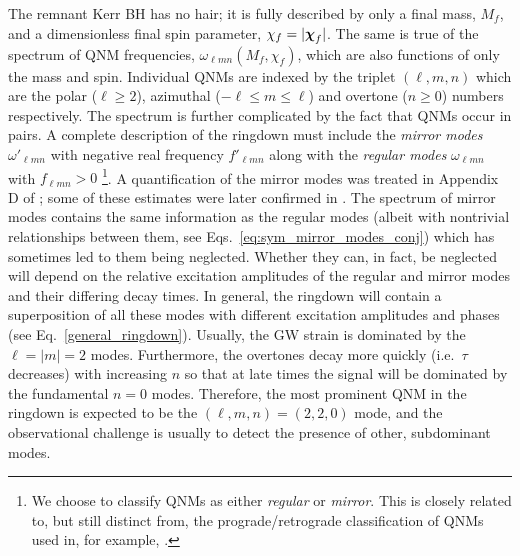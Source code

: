 The remnant Kerr BH has no hair; it is fully described by only a final mass, $M_f$, and a dimensionless final spin parameter, $\chi_f = |\vb*{\chi}_f|$. 
The same is true of the spectrum of QNM frequencies, $\omega_{\ell m n}(M_f, \chi_f)$, which are also functions of only the mass and spin. 
Individual QNMs are indexed by the triplet $(\ell, m, n)$ which are the polar ($\ell\geq2$), azimuthal ($-\ell \leq m \leq \ell$) and overtone ($n \geq 0$) numbers respectively. 
The spectrum is further complicated by the fact that QNMs occur in pairs. 
A complete description of the ringdown must include the \emph{mirror modes} $\omega'_{\ell m n}$ \cite{qnms, bcw, mirror_modes, 2014PhRvD..90l4032L} with negative real frequency $f'_{\ell m n}$ along with the \emph{regular modes} $\omega_{\ell m n}$ with $f_{\ell m n}>0$
\footnote{We choose to classify QNMs as either \emph{regular} or \emph{mirror}. This is closely related to, but still distinct from, the prograde/retrograde classification of QNMs used in, for example, \cite{gwtc-2_tests}.}.
A quantification of the mirror modes was treated in Appendix D of \cite{2020PhRvD.102d4053J}; some of these estimates were later confirmed in \cite{mirror_modes}.
The spectrum of mirror modes contains the same information as the regular modes (albeit with nontrivial relationships between them, see Eqs.~\ref{eq:sym_mirror_modes_conj}) which has sometimes led to them being neglected. 
Whether they can, in fact, be neglected will depend on the relative excitation amplitudes of the regular and mirror modes and their differing decay times. 
In general, the ringdown will contain a superposition of all these modes with different excitation amplitudes and phases (see Eq.~\ref{general_ringdown}). 
Usually, the GW strain is dominated by the $\ell=|m|=2$ modes. 
Furthermore, the overtones decay more quickly (i.e.\ $\tau$ decreases) with increasing $n$ so that at late times the signal will be dominated by the fundamental $n=0$ modes. 
Therefore, the most prominent QNM in the ringdown is expected to be the $(\ell, m, n)=(2,2,0)$ mode, and the observational challenge is usually to detect the presence of other, subdominant modes.

